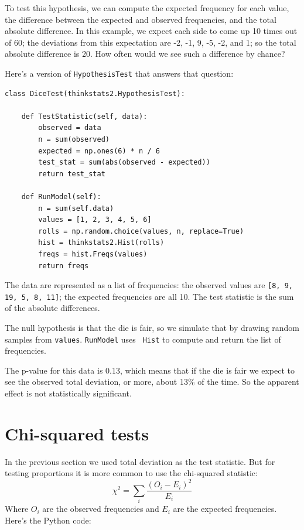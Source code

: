 \documentclass[12pt]{book}
\newcommand{\goodchi}{\chi}
\theoremstyle{exercise}
\begin{document}
To test this hypothesis, we can compute the expected frequency for
each value, the difference between the expected and observed
frequencies, and the total absolute difference.  In this
example, we expect each side to come up 10 times out of 60; the
deviations from this expectation are -2, -1, 9, -5, -2, and 1; so the
total absolute difference is 20.  How often would we see such a
difference by chance?%

Here's a version of {\tt HypothesisTest} that answers that question:%

\begin{verbatim}
class DiceTest(thinkstats2.HypothesisTest):

    def TestStatistic(self, data):
        observed = data
        n = sum(observed)
        expected = np.ones(6) * n / 6
        test_stat = sum(abs(observed - expected))
        return test_stat

    def RunModel(self):
        n = sum(self.data)
        values = [1, 2, 3, 4, 5, 6]
        rolls = np.random.choice(values, n, replace=True)
        hist = thinkstats2.Hist(rolls)
        freqs = hist.Freqs(values)
        return freqs
\end{verbatim}

The data are represented as a list of frequencies: the observed
values are {\tt [8, 9, 19, 5, 8, 11]}; the expected frequencies
are all 10.  The test statistic is the sum of the absolute differences.%

The null hypothesis is that the die is fair, so we simulate that by
drawing random samples from {\tt values}.  {\tt RunModel} uses {\tt
  Hist} to compute and return the list of frequencies.%
%
%

The p-value for this data is 0.13, which means that if the die is
fair we expect to see the observed total deviation, or more, about
13\% of the time.  So the apparent effect is not statistically
significant.%
%
%
%


\section{Chi-squared tests}%
\label{casino2}

In the previous section we used total deviation as the test statistic.
But for testing proportions it is more common to use the chi-squared
statistic:
%
\[ \goodchi^2 = \sum_i \frac{(O_i - E_i)^2}{E_i} \]
% 
Where $O_i$ are the observed frequencies and $E_i$ are the expected
frequencies.  Here's the Python code:%
%
%
\end{document}
